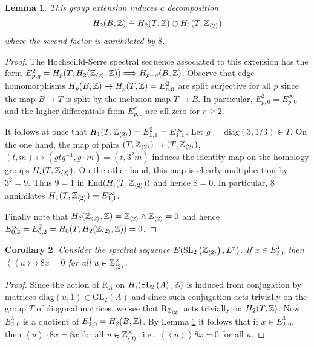 \documentclass[12pt]{amsart}
\newtheorem{lem}{Lemma}[section]
\newtheorem{cor}[lem]{Corollary}
\theoremstyle{definition}
\newcommand{\Z}{\Bbb{Z}}
\newcommand{\spl}[2]{\operatorname{SL}_{#1}\left(#2\right)}
\newcommand{\gl}[2]{\mathrm{GL}_{#1}(#2)}
\newcommand{\<}{\langle}
\renewcommand{\>}{\rangle}
\newcommand{\sgr}[1]{\mathrm{R}_{#1}}%
\newcommand{\an}[1]{\left\langle{#1}\right\rangle}
\newcommand{\pf}[1]{\left\langle\!\left\langle{#1}\right\rangle\!\right\rangle}
\begin{document}
\begin{lem} \label{lem:tb}
This group extension  induces a decomposition
 \[
H_2(B,\Z)\cong H_2(T,\Z)\oplus H_1(T,\Z_{\an{2}})
\]
 where the second factor is annihilated by $8$.
\end{lem}

\begin{proof} The Hochscilld-Serre spectral sequence associated to this extension has the form $E^2_{p,q}=H_p(T,H_2(\Z_{\an{2}},\Z))\Longrightarrow H_{p+q}(B,\Z)$.
 Observe that edge homomorphisms 
$H_p(B,\Z)\to H_p(T,\Z)=E^2_{p,0}$ are split surjective  for all $p$ since the map $B\to T$ is split by the inclusion map $T\to B$. In particular, $E^2_{p,0}=E^\infty_{p,0}$ and the higher differentials from $E^r_{p,0}$ are all zero for $r\geq 2$. 

It follows at once that $H_1(T,\Z_{\an{2}})=E^2_{1,1}=E^\infty_{1,1}$. Let $g:=\mathrm{diag}(3,1/3)\in T$. On the one hand, the map of pairs $(T,\Z_{\an{2}})\to(T,\Z_{\an{2}})$, 
$(t,m)\mapsto (gtg^{-1},g\cdot  m)=(t,3^2m)$ induces the identity map on the homology groups $H_i(T,\Z_{\an{2}})$. On the other hand, this map is clearly multiplication by $3^2=9$. Thus
$9=1$ in $\mathrm{End}(H_i(T,\Z_{\an{2}}))$ and hence $8=0$. In particular, $8$ annihilates $H_1(T,\Z_{\an{2}})=E^\infty_{1,1}$.

Finally note that $H_2(\Z_{\an{2}},\Z)=\Z_{\an{2}}\wedge \Z_{\an{2}}=0$ and hence\\
 $E^\infty_{0,2}=E^2_{0,2}=H_0(T,H_2(\Z_{\an{2}},\Z))=0$.
\end{proof}

\begin{cor}\label{cor:8x}  Consider the spectral sequence $E(\spl{2}{\Z_{\an{2}}}, L^\tau)$. If $x\in E^3_{2,0}$ then $\pf{u}8x=0$ for all $u\in \Z_{\an{2}}^\times$. 
\end{cor}
\begin{proof}
Since the action of $\sgr{A}$ on $H_i(\spl{2}{A},\Z)$ is induced from conjugation by matrices $\mathrm{diag}(u,1)\in \gl{2}{A}$ and since such conjugation acts trivially on the group $T$ of diagonal matrices, we see that $\sgr{\Z_{\an{2}}}$ acts trivially on $H_2(T,\Z)$. Now $E^3_{2,0}$ is a quotient of $E^1_{2,0}=H_2(B,\Z)$. By Lemma \ref{lem:tb} it follows that  if $x\in E^3_{2,0}$, then $\an{u}\cdot 8x=8x$ for all $u\in \Z_{\an{2}}^\times$; i.e., $\pf{u}8x=0$ for all $u$.
\end{proof}
\end{document}

